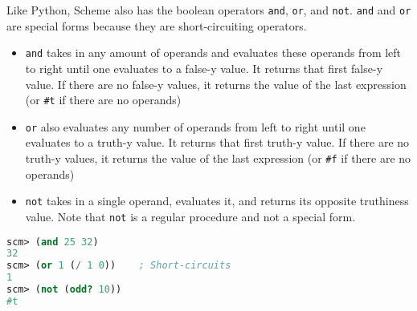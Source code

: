 Like Python, Scheme also has the boolean operators \lstinline$and$,
\lstinline$or$, and \lstinline$not$.  \lstinline$and$ and \lstinline$or$ are
special forms because they are short-circuiting operators.

\begin{itemize}
\item \texttt{and} takes in any amount of operands and evaluates these operands
from left to right until one evaluates to a false-y value. It returns
that first false-y value. If there are no false-y values, it returns the value
of the last expression (or \texttt{\#t} if there are no operands)
\item \texttt{or} also evaluates any number of operands from left to right
until one evaluates to a truth-y value. It returns that first truth-y 
value. If there are no truth-y values, it returns the value of the last expression
(or \texttt{\#f} if there are no operands)
\item \texttt{not} takes in a single operand, evaluates it, and returns its
opposite truthiness value. Note that \texttt{not} is a regular procedure
and not a special form.
\end{itemize}

\begin{lstlisting}[language=Scheme]
scm> (and 25 32)
32
scm> (or 1 (/ 1 0))    ; Short-circuits
1
scm> (not (odd? 10)) 
#t
\end{lstlisting}

